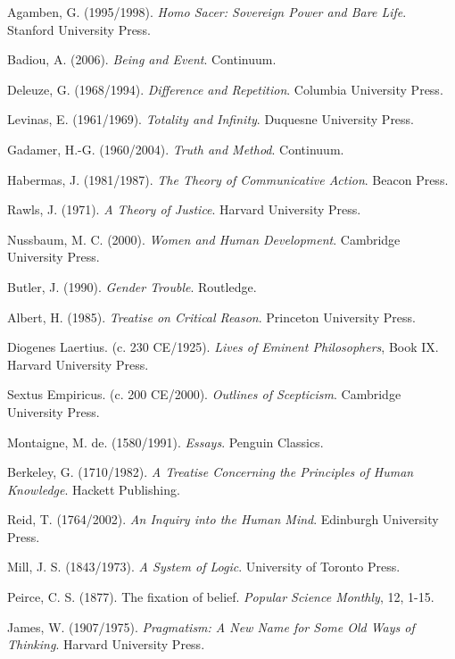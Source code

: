 \documentclass[12pt,a4paper]{article}
\begin{document}
\begin{thebibliography}{99}
Agamben, G. (1995/1998). \textit{Homo Sacer: Sovereign Power and Bare Life}. Stanford University Press.

Badiou, A. (2006). \textit{Being and Event}. Continuum.

Deleuze, G. (1968/1994). \textit{Difference and Repetition}. Columbia University Press.

Levinas, E. (1961/1969). \textit{Totality and Infinity}. Duquesne University Press.

Gadamer, H.-G. (1960/2004). \textit{Truth and Method}. Continuum.

Habermas, J. (1981/1987). \textit{The Theory of Communicative Action}. Beacon Press.

Rawls, J. (1971). \textit{A Theory of Justice}. Harvard University Press.

Nussbaum, M. C. (2000). \textit{Women and Human Development}. Cambridge University Press.

Butler, J. (1990). \textit{Gender Trouble}. Routledge.

Albert, H. (1985). \textit{Treatise on Critical Reason}. Princeton University Press.

Diogenes Laertius. (c. 230 CE/1925). \textit{Lives of Eminent Philosophers}, Book IX. Harvard University Press.

Sextus Empiricus. (c. 200 CE/2000). \textit{Outlines of Scepticism}. Cambridge University Press.

Montaigne, M. de. (1580/1991). \textit{Essays}. Penguin Classics.

Berkeley, G. (1710/1982). \textit{A Treatise Concerning the Principles of Human Knowledge}. Hackett Publishing.

Reid, T. (1764/2002). \textit{An Inquiry into the Human Mind}. Edinburgh University Press.

Mill, J. S. (1843/1973). \textit{A System of Logic}. University of Toronto Press.

Peirce, C. S. (1877). The fixation of belief. \textit{Popular Science Monthly}, 12, 1-15.

James, W. (1907/1975). \textit{Pragmatism: A New Name for Some Old Ways of Thinking}. Harvard University Press.


\end{thebibliography}
\end{document}
